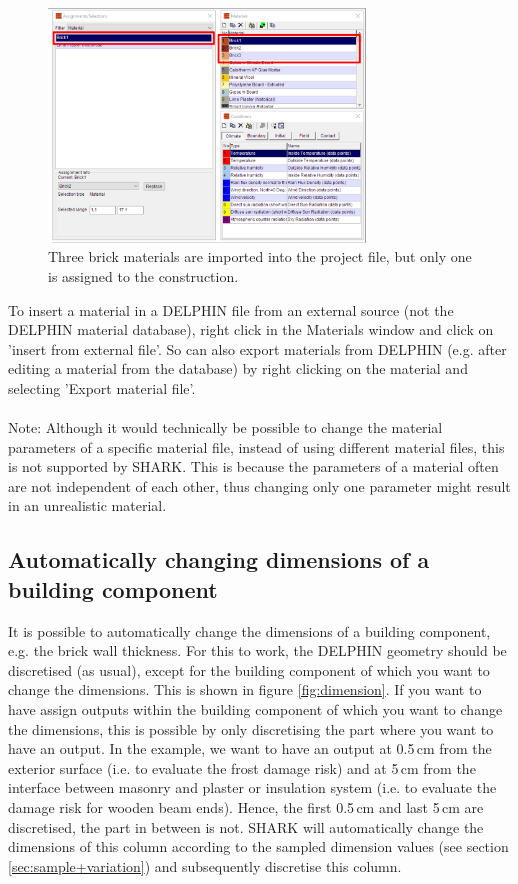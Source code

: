 \documentclass{article}
\begin{document}
\begin{figure}
	\centering
	\includegraphics[width=0.75\textwidth]{./Figures/Materials}
	\caption{Three brick materials are imported into the project file, but only one is assigned to the construction.}
	\label{fig:materials}
\end{figure}

To insert a material in a DELPHIN file from an external source (not the DELPHIN material database), right click in the Materials window and click on 'insert from external file'. So can also export materials from DELPHIN (e.g. after editing a material from the database) by right clicking on the material and selecting 'Export material file'.\\
\vspace{0cm}\\
Note: Although it would technically be possible to change the material parameters of a specific material file, instead of using different material files, this is not supported by SHARK. This is because the parameters of a material often are not independent of each other, thus changing only one parameter might result in an unrealistic material.

\subsection{Automatically changing dimensions of a building component}
It is possible to automatically change the dimensions of a building component, e.g. the brick wall thickness. For this to work, the DELPHIN geometry should be discretised (as usual), except for the building component of which you want to change the dimensions. This is shown in figure \ref{fig:dimension}. If you want to have assign outputs within the building component of which you want to change the dimensions, this is possible by only discretising the part where you want to have an output. In the example, we want to have an output at 0.5\,cm from the exterior surface (i.e. to evaluate the frost damage risk) and at 5\,cm from the interface between masonry and plaster or insulation system (i.e. to evaluate the damage risk for wooden beam ends). Hence, the first 0.5\,cm and last 5\,cm are discretised, the part in between is not. SHARK will automatically change the dimensions of this column according to the sampled dimension values (see section \ref{sec:sample+variation}) and subsequently discretise this column.
\end{document}
